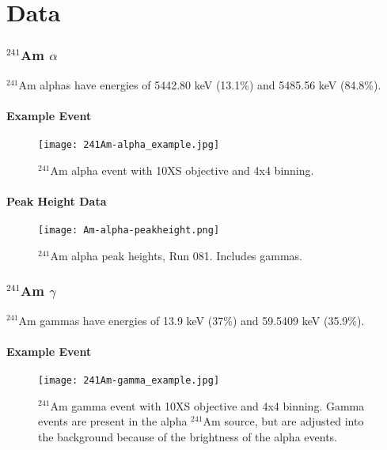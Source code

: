 \documentclass[a4paper,10pt]{article}
\begin{document}

\part{Data}
\section{$^{241}$Am $\alpha$}

$^{241}$Am alphas have energies of 5442.80 keV (13.1\%) and 5485.56 keV (84.8\%).

\subsection{Example Event}
\begin{figure}[!htbp]
   \centering
   \texttt{[image: 241Am-alpha\_example.jpg]} %
   \caption{$^{241}$Am alpha event with 10XS objective and 4x4 binning.}
   \label{fig:10XSAmalpha}
\end{figure}

\subsection{Peak Height Data}
\begin{figure}[!htbp]
	\centering
	\texttt{[image: Am-alpha-peakheight.png]}
	\caption{$^{241}$Am alpha peak heights, Run 081. Includes gammas.}
	\label{fig:Am-allpha-peakheights}
\end{figure}

\section{$^{241}$Am $\gamma$}

$^{241}$Am gammas have energies of 13.9 keV (37\%) and 59.5409 keV (35.9\%).

\subsection{Example Event}
\begin{figure}[!htbp]
	\centering
	\texttt{[image: 241Am-gamma\_example.jpg]}
	\caption{$^{241}$Am gamma event with 10XS objective and 4x4 binning. Gamma events are present in the alpha $^{241}$Am source, but are adjusted into the background because of the brightness of the alpha events.}
	\label{fig:10XSAmgamma}
\end{figure}
\end{document}
